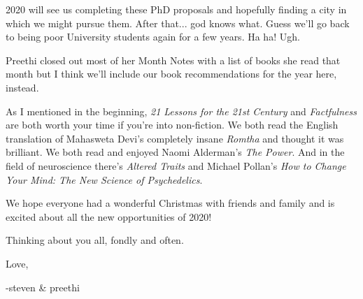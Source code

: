 \documentclass{article}
\begin{document}
2020 will see us completing these PhD proposals and hopefully finding a city in which
we might pursue them. After that... god knows what. Guess we'll go back to being poor
University students again for a few years. Ha ha! Ugh.

Preethi closed out most of her Month Notes with a list of books she read that month
but I think we'll include our book recommendations for the year here, instead.

As I mentioned in the beginning, \textit{21 Lessons for the 21st Century} and
\textit{Factfulness} are both worth your time if you're into non-fiction. We both
read the English translation of Mahasweta Devi's completely insane \textit{Romtha}
and thought it was brilliant. We both read and enjoyed Naomi Alderman's \textit{The
  Power}. And in the field of neuroscience there's \textit{Altered Traits} and
Michael Pollan's \textit{How to Change Your Mind: The New Science of Psychedelics}.

We hope everyone had a wonderful Christmas with friends and family and is excited
about all the new opportunities of 2020!

Thinking about you all, fondly and often.

Love,

-steven \& preethi
\end{document}

